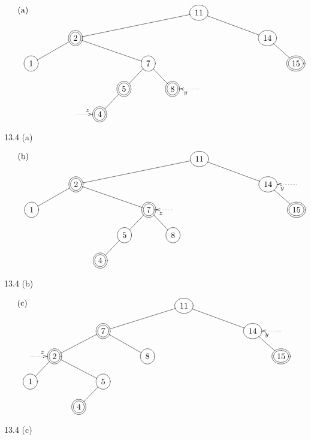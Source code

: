 \documentclass[a4paper,twoside,DIV15,BCOR12mm]{scrbook}
\begin{document}
\begin{figure}[htb]
	\centering
	$\begin{xy}
		\entrymodifiers={}
		
		\xymatrixcolsep{1pc}
		\xymatrixrowsep{1pc}
\text{(a)}
		\xymatrix {
& & & & & & & &*++[o][F-]{11}\ar@{-}[rrrrrd]\ar@{-}[llllld]& & & \\
& & &*++[o][F=]{2} \ar@{-}[rrrd]\ar@{-}[llld]& & & & & & & & & &*++[o][F-]{14} \ar@{-}[rd]& \\
*++[o][F-]{1}& & & & & &*++[o][F-]{7} \ar@{-}[rd] \ar@{-}[ld]& & & & & & & & *++[o][F=]{15} \\
& & & & &*++[o][F=]{5}\ar@{-}[ld]& &*++[o][F=]{8}& \ar@{.>}[l]^{y} & & & & & & \\
& & & \ar@{.>}[r]^{z}&*++[o][F=]{4}& & & & & & & & & &\\
		}
	\end{xy}$
		\caption{13.4 (a)}
	\label{Abbildung 13.4 (a)}

\end{figure}
\begin{figure}[htb]
	\centering
	$\begin{xy}
		\entrymodifiers={}
		
		\xymatrixcolsep{1pc}
		\xymatrixrowsep{1pc}
	\text{(b)}
		\xymatrix {
& & & & & & & &*++[o][F-]{11}\ar@{-}[rrrrrd]\ar@{-}[llllld]& & & \\
& & &*++[o][F=]{ 2 } \ar@{-}[rrrd]\ar@{-}[llld]& & & & & & & & & &*++[o][F-]{14} \ar@{-}[rd]&\ar@{.>}[l]^{y}\\
*++[o][F-]{1}& & & & & & *++[o][F=]{7} \ar@{-}[rd] \ar@{-}[ld]& \ar@{.>}[l]^{z} & & & & & & & *++[o][F=]{15} \\
& & & & &*++[o][F-]{5} \ar@{-}[ld]& &*++[o][F-]{8}& & & & \\
& & & &*++[o][F=]{4}& & & & & & &\\
		}
	\end{xy}$
		\caption{13.4 (b)}
	\label{Abbildung 13.4 (b)}

\end{figure}
\begin{figure}[htb]
	\centering
	$\begin{xy}
		\entrymodifiers={}
		
		\xymatrixcolsep{1pc}
		\xymatrixrowsep{1pc}
		\text{(c)}
		\xymatrix {
& & & & & & & &*++[o][F-:red]{11}\ar@{-}[rrrrrd]\ar@{-}[llllld]& & & \\
& & &*++[o][F=]{7} \ar@{-}[rrrd]\ar@{-}[lld]& & & & & & & & & &*++[o][F-]{14} \ar@{-}[rd]&\ar@{.>}[l]^{y} \\
 \ar@{.>}[r]^{z}&*++[o][F=]{2} \ar@{-}[ld]\ar@{-}[rrd]& & & & &*++[o][F-]{8}& & & & & & & & *++[o][F=]{15} \\
*++[o][F-]{1}& & &*++[o][F-]{5}\ar@{-}[ld]& & & & & & & & & & & \\
& &*++[o][F=]{4}\\
		}
	\end{xy}$
		\caption{13.4 (c)}
	\label{Abbildung 13.4 (c)}

\end{figure}
\end{document}
